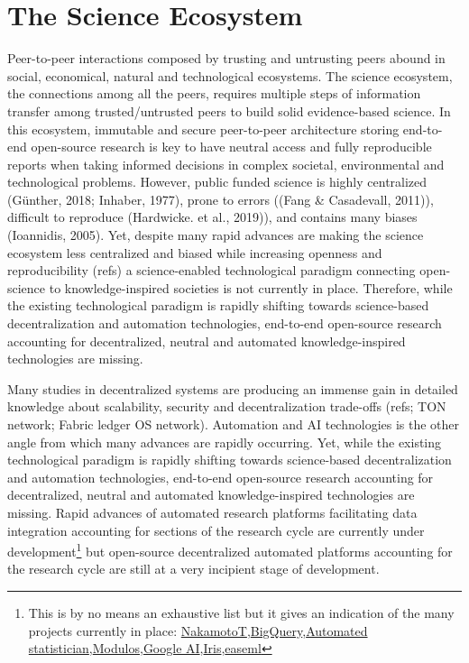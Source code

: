 \documentclass[10pt, a4paper, twocolumn]{article} %
\begin{document}
\section{The Science Ecosystem}
Peer-to-peer interactions composed by trusting and untrusting peers
abound in social, economical, natural and technological
ecosystems. The science ecosystem, the connections among all the
peers, requires multiple steps of information transfer among
trusted/untrusted peers to build solid evidence-based science. In this
ecosystem, immutable and secure peer-to-peer architecture storing
end-to-end open-source research is key to have neutral access and
fully reproducible reports when taking informed decisions in complex
societal, environmental and technological problems. However, public
funded science is highly centralized (Günther, 2018; Inhaber, 1977)⁠⁠,
prone to errors ((Fang & Casadevall, 2011)⁠), difficult to reproduce
(Hardwicke. et al., 2019)), and contains many biases (Ioannidis,
2005). Yet, despite many rapid advances are making the science
ecosystem less centralized and biased while increasing openness and
reproducibility (refs) a science-enabled technological paradigm
connecting open-science to knowledge-inspired societies is not
currently in place. Therefore, while the existing technological
paradigm is rapidly shifting towards science-based decentralization
and automation technologies, end-to-end open-source research
accounting for decentralized, neutral and automated knowledge-inspired
technologies are missing.

Many studies in decentralized systems are producing an immense gain in
detailed knowledge about scalability, security and decentralization
trade-offs (refs; TON network; Fabric ledger OS network). Automation
and AI technologies is the other angle from which many advances are
rapidly occurring. Yet, while the existing technological paradigm is
rapidly shifting towards science-based decentralization and automation
technologies, end-to-end open-source research accounting for
decentralized, neutral and automated knowledge-inspired technologies
are missing. Rapid advances of automated research platforms
facilitating data integration accounting for sections of the research
cycle are currently under development\footnote{This is by no means an
  exhaustive list but it gives an indication of the many projects
  currently in place:
  \href{https://www.nterminal.com}{NakamotoT},\href{https://cloud.google.com/bigquery/}{BigQuery},\href{https://www.automaticstatistician.com/index/}{Automated
    statistician},\href{http://www.modulos.ai/}{Modulos},\href{https://ai.google/}{Google
    AI},\href{https://iris.ai}{Iris},\href{https://github.com/DS3Lab/easeml}{easeml}}
but open-source decentralized automated platforms accounting for the
research cycle are still at a very incipient stage of development.
\end{document}
